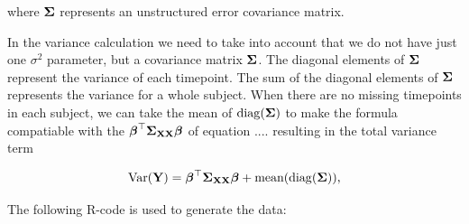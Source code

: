 \documentclass[11pt,a4paper,twoside]{book}
\begin{document}
where ${\boldsymbol{\Sigma}}{}$ represents an unstructured error covariance matrix.

In the variance calculation we need to take into account that we do not have just one $\sigma^2$ parameter, but a covariance matrix ${\boldsymbol{\Sigma}}{}$. The diagonal elements of ${\boldsymbol{\Sigma}}{}$ represent the variance of each timepoint. The sum of the diagonal elements of ${\boldsymbol{\Sigma}}{}$ represents the variance for a whole subject. When there are no missing timepoints in each subject, we can  take the mean of $\operatorname{diag}({\boldsymbol{\Sigma}}{})$ to make the formula compatiable with the ${\boldsymbol{\beta}}^\top {\boldsymbol{\Sigma}}{}_{{\mathbf{X}} {\mathbf{X}}}  {\boldsymbol{\beta}}$ of equation .... resulting in the total variance term

      \begin{align} 
        \operatorname{Var}({\mathbf{Y}}) = {\boldsymbol{\beta}}^\top {\boldsymbol{\Sigma}}{}_{{\mathbf{X}} {\mathbf{X}}}  {\boldsymbol{\beta}} + \text{mean}(\operatorname{diag}({\boldsymbol{\Sigma}}{})),
   \end{align}

The following R-code is used to generate the data:
\end{document}
